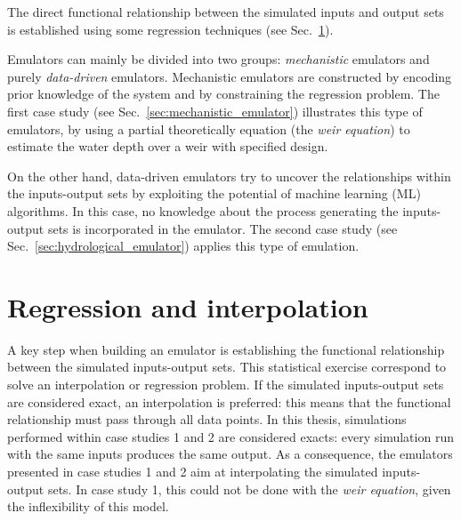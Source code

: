 The direct functional relationship between the simulated inputs and output sets is established using some regression techniques (see Sec.~\ref{sec:regression_interpolation}).

Emulators can mainly be divided into two groups: \emph{mechanistic} emulators and purely \emph{data-driven} emulators.
Mechanistic emulators are constructed by encoding prior knowledge of the system and by constraining the regression problem. The first case study (see Sec.~\ref{sec:mechanistic_emulator}) illustrates this type of emulators, by using a partial theoretically equation (the \textit{weir equation}) to estimate the water depth over a weir with specified design.

On the other hand, data-driven emulators try to uncover the relationships within the inputs-output sets by exploiting the potential of machine learning (ML) algorithms. In this case, no knowledge about the process generating the inputs-output sets is incorporated in the emulator. The second case study (see Sec.~\ref{sec:hydrological_emulator}) applies this type of emulation. 


\section{Regression and interpolation}\label{sec:regression_interpolation}

A key step when building an emulator is establishing the functional relationship between the simulated inputs-output sets. This statistical exercise correspond to solve an interpolation or regression problem.
If the simulated inputs-output sets are considered exact, an interpolation is preferred: this means that the functional relationship must pass through all data points. In this thesis, simulations performed within case studies 1 and 2 are considered exacts: every simulation run with the same inputs produces the same output.
As a consequence, the emulators presented in case studies 1 and 2 aim at interpolating the simulated inputs-output sets.
In case study 1, this could not be done with the \textit{weir equation}, given the inflexibility of this model.\\

